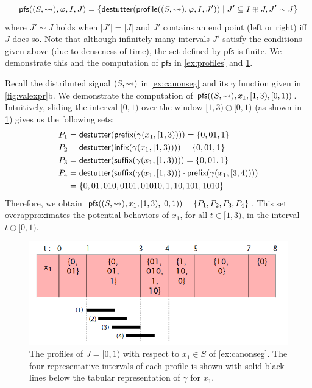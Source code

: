 \small
\begin{align*}
	\mathsf{pfs}((S,{\hb}), \varphi, I, J) = \{\destutter(\mathsf{profile}((S,{\hb}), \varphi, I, J')) \st J' \subseteq I \oplus J, J' \sim J\}
\end{align*}
\normalsize
where $J' \sim J$ holds when $|J'| = |J|$ and $J'$ contains an end point (left or right) iff $J$ does so.
Note that although infinitely many intervals $J'$ satisfy the conditions given above (due to denseness of time), the set defined by $\mathsf{pfs}$ is finite.
We demonstrate this and the computation of $\mathsf{pfs}$ in \cref{ex:profiles} and \cref{fig:profiles}.

\begin{example} \label{ex:profiles}
	Recall the distributed signal $(S, {\rightsquigarrow})$ in \cref{ex:canonseg} and its $\gamma$ function given in \cref{fig:valexpr}b.
	We demonstrate the computation of $\mathsf{pfs}((S,{\rightsquigarrow}), x_1, [1,3), [0,1))$.
	Intuitively, sliding the interval $[0,1)$ over the window $[1,3) \oplus [0,1)$ (as shown in \cref{fig:profiles}) gives us the following sets:
	\begin{align*}
		P_1 &= \mathsf{destutter}(\textsf{prefix}(\gamma(x_1, [1,3)))) = \{ 0, 01, 1 \}\\
		P_2 &= \mathsf{destutter}(\textsf{infix}(\gamma(x_1, [1,3)))) = \{ 0, 01, 1 \} \\
		P_3 &= \mathsf{destutter}(\textsf{suffix}(\gamma(x_1, [1,3)))) = \{ 0, 01, 1 \} \\
		P_4 &= \mathsf{destutter}(\textsf{suffix}(\gamma(x_1, [1,3))) \cdot \textsf{prefix}(\gamma(x_1, [3,4)))) \\
		&= \{ 0, 01, 010, 0101, 01010, 1, 10, 101, 1010 \}
	\end{align*}
	Therefore, we obtain $\mathsf{pfs}((S,{\rightsquigarrow}), x_1, [1,3), [0,1)) = \{P_1, P_2, P_3, P_4\}$.
	This set overapproximates the potential behaviors of $x_1$, for all $t \in [1,3)$, in the interval $t \oplus [0,1)$.
\end{example}

\begin{figure} 
	\centering
	\includegraphics[scale=0.45]{profiles.png}
	\caption{The profiles of $J = [0,1)$ with respect to $x_1 \in S$ of \cref{ex:canonseg}. The four representative intervals of each profile is shown with solid black lines below the tabular representation of $\gamma$ for $x_1$.}
	\label{fig:profiles}
\end{figure}

